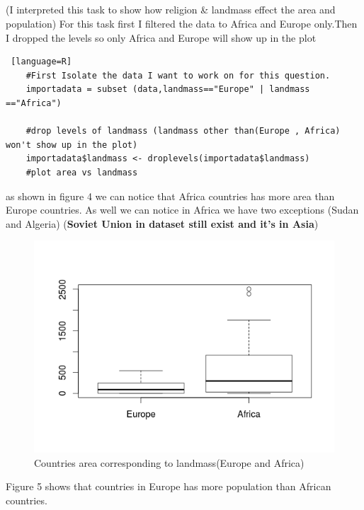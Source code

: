 \documentclass{article}
\begin{document}
	\subsection*{}
	(I interpreted this task to show how religion \& landmass effect the area and population)
	For this task first I filtered the data to Africa and Europe only.Then I dropped the levels so only Africa and Europe will show up in the plot
	\begin{lstlisting} [language=R]
	#First Isolate the data I want to work on for this question.
	importadata = subset (data,landmass=="Europe" | landmass =="Africa")
	
	#drop levels of landmass (landmass other than(Europe , Africa) won't show up in the plot)
	importadata$landmass <- droplevels(importadata$landmass)
	#plot area vs landmass
	\end{lstlisting}
	as shown in figure 4 we can notice that Africa countries has more area than Europe countries. As well we can notice in Africa we have two exceptions (Sudan and Algeria) (\textbf{Soviet Union in dataset still exist and it's in Asia})
	\begin{figure}[H]
		\begin{center} 
			\includegraphics[scale=0.9]{boxplotareavslandmass.png} %
		\end{center}
		\caption{Countries area corresponding to landmass(Europe and Africa)} %
	\end{figure}
	Figure 5 shows that countries in Europe has more population than African countries.
\end{document}
